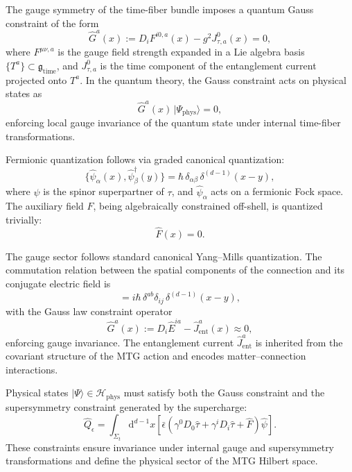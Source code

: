 \documentclass[11pt]{article}
\begin{document}
The gauge symmetry of the time-fiber bundle imposes a quantum Gauss constraint of the form
\begin{equation}
\hat{G}^a(x) := D_i F^{i0,a}(x) - g^2 J^0_{\tau,a}(x) = 0,
\end{equation}
where \( F^{\mu\nu,a} \) is the gauge field strength expanded in a Lie algebra basis \( \{T^a\} \subset \mathfrak{g}_{\mathrm{time}} \), and \( J^0_{\tau,a} \) is the time component of the entanglement current projected onto \( T^a \). In the quantum theory, the Gauss constraint acts on physical states as
\begin{equation}
\hat{G}^a(x) \, |\Psi_{\mathrm{phys}}\rangle = 0,
\end{equation}
enforcing local gauge invariance of the quantum state under internal time-fiber transformations.

Fermionic quantization follows via graded canonical quantization:
\begin{equation}
\{ \hat{\psi}_\alpha(x), \hat{\psi}^\dagger_\beta(y) \} = \hbar \, \delta_{\alpha\beta} \, \delta^{(d-1)}(x - y),
\end{equation}
where \( \psi \) is the spinor superpartner of \( \tau \), and \( \hat{\psi}_\alpha \) acts on a fermionic Fock space. The auxiliary field \( F \), being algebraically constrained off-shell, is quantized trivially:
\begin{equation}
\hat{F}(x) = 0.
\end{equation}

The gauge sector follows standard canonical Yang--Mills quantization. The commutation relation between the spatial components of the connection and its conjugate electric field is
\begin{equation}
[ \hat{A}_i^a(x), \hat{E}_j^b(y) ] = i \hbar \, \delta^{ab} \delta_{ij} \, \delta^{(d-1)}(x - y),
\end{equation}
with the Gauss law constraint operator
\begin{equation}
\hat{G}^a(x) := D_i \hat{E}^{ia} - \hat{J}^{a}_{\mathrm{ent}}(x) \approx 0,
\end{equation}
enforcing gauge invariance. The entanglement current \( \hat{J}^{a}_{\mathrm{ent}} \) is inherited from the covariant structure of the MTG action and encodes matter–connection interactions.

Physical states \( |\Psi\rangle \in \mathcal{H}_{\mathrm{phys}} \) must satisfy both the Gauss constraint and the supersymmetry constraint generated by the supercharge:
\begin{equation}
\hat{Q}_\epsilon = \int_{\Sigma_t} \mathrm{d}^{d-1}x \left[ \bar{\epsilon} \left( \gamma^0 D_0 \hat{\tau} + \gamma^i D_i \hat{\tau} + \hat{F} \right) \hat{\psi} \right].
\end{equation}
These constraints ensure invariance under internal gauge and supersymmetry transformations and define the physical sector of the MTG Hilbert space.
\end{document}
